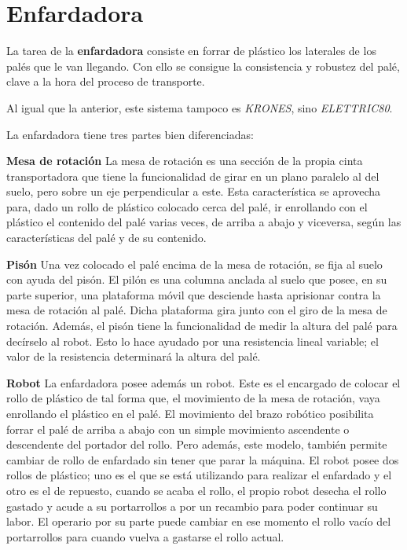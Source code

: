 \documentclass[11pt,a4paper,spanish,twoside]{report}
\begin{document}
\section{Enfardadora}
La tarea de la \textbf{enfardadora} consiste en forrar de plástico los 
laterales de los palés que le van llegando. Con ello se consigue la 
consistencia y robustez del palé, clave a la hora del proceso de transporte.

Al igual que la anterior, este sistema tampoco es \emph{KRONES}, sino 
\emph{ELETTRIC80}.


La enfardadora tiene tres partes bien diferenciadas:
\begin{description}
\item \textbf{Mesa de rotación}
La mesa de rotación es una sección de la propia cinta transportadora que tiene 
la funcionalidad de girar en un plano paralelo al del suelo, pero sobre un eje 
perpendicular a este. Esta característica se aprovecha para, dado un rollo de 
plástico colocado cerca del palé, ir enrollando con el plástico el contenido 
del palé varias veces, de arriba a abajo y viceversa, según las 
características del palé y de su contenido.
\item \textbf{Pisón}
Una vez colocado el palé encima de la mesa de rotación, se fija al suelo con 
ayuda del pisón. El pilón es una columna anclada al suelo que posee, en su 
parte superior, una plataforma móvil que desciende hasta aprisionar contra la
mesa de rotación al palé. Dicha plataforma gira junto con el giro de la mesa de
rotación. Además, el pisón tiene la funcionalidad de medir la altura del palé 
para decírselo al robot. Esto lo hace ayudado por una resistencia lineal
variable; el valor de la resistencia determinará la altura del palé.
\item \textbf{Robot}
La enfardadora posee además un robot. Este es el encargado de colocar el rollo 
de plástico de tal forma que, el movimiento de la mesa de rotación, vaya 
enrollando el plástico en el palé. El movimiento del brazo robótico posibilita 
forrar el palé de arriba a abajo con un simple movimiento ascendente o 
descendente del portador del rollo. Pero además, este modelo, también permite 
cambiar de rollo de enfardado sin tener que parar la máquina. El robot posee 
dos rollos de plástico; uno es el que se está utilizando para realizar el 
enfardado y el otro es el de repuesto, cuando se acaba el rollo, el propio 
robot desecha el rollo gastado y acude a su portarrollos a por un recambio para
poder continuar su labor. El operario por su parte puede cambiar en ese momento
el rollo vacío del portarrollos para cuando vuelva a gastarse el rollo actual.
\end{description}
\end{document}
